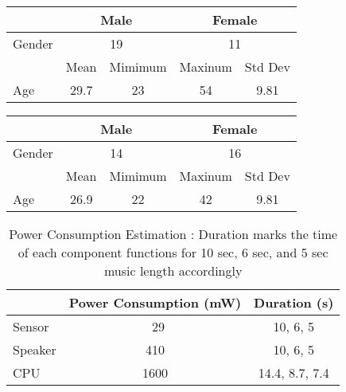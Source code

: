 \begin{table}[h]
\begin{tabular}{lclcl}
\cline{2-5}
       & \multicolumn{2}{c}{Male}                          & \multicolumn{2}{c}{Female}                             \\ \hline\hline
Gender & \multicolumn{2}{c}{19}                            & \multicolumn{2}{c}{11}                                 \\ \hline
       & \multicolumn{1}{l}{Mean} & \multicolumn{1}{l}{Mimimum}                & \multicolumn{1}{l}{Maxinum} & \multicolumn{1}{l}{Std Dev}                  \\ \hline\hline
Age    & \multicolumn{1}{c}{29.7}                     & \multicolumn{1}{c}{23} & \multicolumn{1}{c}{54}                          & \multicolumn{1}{c}{9.81} \\ \hline
\end{tabular}
\end{table}


\begin{table}[h]
\begin{tabular}{lclcl}
\cline{2-5}
       & \multicolumn{2}{c}{Male}                          & \multicolumn{2}{c}{Female}                             \\ \hline\hline
Gender & \multicolumn{2}{c}{14}                            & \multicolumn{2}{c}{16}                                 \\ \hline
       & \multicolumn{1}{l}{Mean} & \multicolumn{1}{l}{Mimimum}                & \multicolumn{1}{l}{Maxinum} & \multicolumn{1}{l}{Std Dev}                  \\ \hline\hline
Age   & \multicolumn{1}{c}{26.9}                     & \multicolumn{1}{c}{22} & \multicolumn{1}{c}{42}                          & \multicolumn{1}{c}{9.81}
\end{tabular}
\end{table}


\begin{table}[h]
\begin{tabular}{lcc}
\hline
        & Power Consumption (mW) & Duration (s)      \\ \hline\hline
Sensor  & ~29                    & 10, 6, 5       \\
Speaker & 410                    & 10, 6, 5       \\
CPU     & 1600                   & 14.4, 8.7, 7.4 \\ \hline
\end{tabular}
\caption{Power Consumption Estimation : Duration marks the time of each component functions for 10 sec, 6 sec, and 5 sec music length accordingly }
\label{tab:pow}
\end{table}


